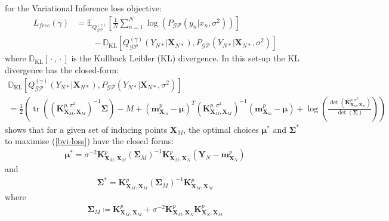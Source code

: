 \documentclass{article}
\newcommand{\KLD}{\operatorname{\mathbb{D}_{\text{KL}}}}
\newcommand{\tr}{\operatorname{tr}}
\newcommand{\GP}{\operatorname{\mathcal{GP}}}
\newcommand{\wc}{\operatorname{{}\cdot{}}}
\numberwithin{equation}{section}
\begin{document}
for the Variational Inference loss objective:
\begin{align}
    \label{bvi-loss}
    L_{free}(\gamma) &=\mathbb{E}_{Q^{(\gamma)}_{\GP}}\left[\frac{1}{N}\sum_{n=1}^N\log \left(P_{\GP}\left(y_n \vert x_n, \sigma^2\right)\right)\right] \nonumber \\
    & \qquad - \KLD \left[Q^{(\gamma)}_{\GP}\left(Y_{N*} \vert \mathbf{X}_{N*}\right), P_{\GP}\left( Y_{N*} \vert \mathbf{X}_{N*}, \sigma^2\right) \right]
\end{align}
where $\KLD[\wc, \wc]$ is the Kullback Leibler (KL) divergence. In this set-up the KL divergence has the closed-form:
  \begin{multline}
    \KLD \left[Q^{(\gamma)}_{\GP}\left(Y_{N*} \vert \mathbf{X}_{N*}\right), P_{\GP}\left( Y_{N*} \vert \mathbf{X}_{N*}, \sigma^2\right) \right] \\
    = \frac{1}{2}\left( \tr\left(\left(\mathbf{K}^{p, \sigma^2}_{\mathbf{X}_M, \mathbf{X}_M}\right)^{-1} \boldsymbol{\Sigma}\right) - M +
    \left(\mathbf{m}^p_{\mathbf{X}_m} - \boldsymbol{\mu}\right)^T \left(\mathbf{K}^{p, \sigma^2}_{\mathbf{X}_M, \mathbf{X}_M}\right)^{-1} \left(\mathbf{m}^p_{\mathbf{X}_m} - \boldsymbol{\mu}\right)+ \log\left(\frac{\det\left(\mathbf{K}^{p, \sigma^2}_{\mathbf{X}_M, \mathbf{X}_M}\right)}{\det\left(\boldsymbol{\Sigma}\right)}\right) \right)
    \label{kld-closed-form}
  \end{multline}
\cite{titsias2009variational} shows that for a given set of inducing points $\mathbf{X}_M$, the optimal choices $\boldsymbol{\mu}^*$ and $\mathbf{\Sigma}^*$ to maximise (\ref{bvi-loss}) have the closed forms:
\begin{align}
    \label{svgp-optimal-mean}
    \boldsymbol{\mu}^* = \sigma^{-2}\mathbf{K}^p_{\mathbf{X}_M, \mathbf{X}_M}  \left(\mathbf{\Sigma}_M\right)^{-1}\mathbf{K}^p_{\mathbf{X}_M, \mathbf{X}_N}  \left(\mathbf{Y}_N - \mathbf{m}^p_{\mathbf{X}_N}\right)
\end{align}
and
\begin{align}
    \label{svgp-optimal-covariance}
    \mathbf{\Sigma}^* = \mathbf{K}^p_{\mathbf{X}_M, \mathbf{X}_M}  \left(\mathbf{\Sigma}_M\right)^{-1}\mathbf{K}^p_{\mathbf{X}_M, \mathbf{X}_M} 
\end{align}
where 
\begin{align}
    \mathbf{\Sigma}_M \coloneqq \mathbf{K}^p_{\mathbf{X}_M, \mathbf{X}_M}  + \sigma^{-2}\mathbf{K}^p_{\mathbf{X}_M, \mathbf{X}_N} \mathbf{K}^p_{\mathbf{X}_N, \mathbf{X}_M} 
    \label{svgp-optimal-sigma-m}
\end{align}
\end{document}
